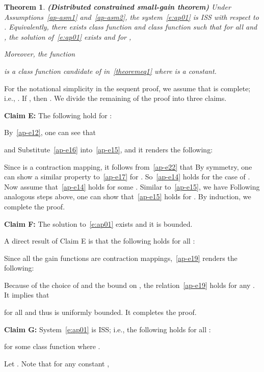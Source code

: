 \documentclass[journal]{IEEEtran}
\newtheorem{theorem}{\bf Theorem}[section]
\begin{document}
\begin{theorem}\textbf{(Distributed constrained small-gain theorem)}
Under Assumptions~\ref{ap-asm1} and~\ref{ap-asm2}, the system~\eqref{e:ap01} is ISS with respect to . Equivalently, there exists class  function  and class  function  such that for all  and , the solution of~\eqref{e:ap01} exists and for ,

Moreover, the function
 
is a class  function candidate of  in~\eqref{theoremeq1} where  is a constant.
\label{ap-the3}
\end{theorem}
\begin{IEEEproof} For the notational simplicity in the sequent proof, we assume that  is complete; i.e., . If , then . We divide the remaining of the proof into three claims.

\textbf{Claim E:} The following hold for : 
\begin{IEEEproof} By~\eqref{ap-e12}, one can see that

and 
Substitute~\eqref{ap-e16} into~\eqref{ap-e15}, and it renders the following:

Since  is a contraction mapping, it follows from~\eqref{ap-e22} that 
By symmetry, one can show a similar property to~\eqref{ap-e17} for . So~\eqref{ap-e14} holds for the case of .
Now assume that~\eqref{ap-e14} holds for some . Similar to~\eqref{ap-e15}, we have 
Following analogous steps above, one can show that~\eqref{ap-e15} holds for . By induction, we complete the proof.
\end{IEEEproof}

\textbf{Claim F:} The solution to~\eqref{e:ap01} exists and it is bounded.
\begin{IEEEproof} A direct result of Claim E is that the following holds for all :

Since all the gain functions  are contraction mappings,~\eqref{ap-e19} renders the following:

Because of the choice of  and the bound on , the relation~\eqref{ap-e19} holds for any . It implies that

for all  and thus is uniformly bounded. It completes the proof.
\end{IEEEproof}

\textbf{Claim G:}
System~\eqref{e:ap01} is ISS; i.e., the following holds for all :

for some class  function  where .
\begin{IEEEproof}
Let . Note that for any constant ,


\end{IEEEproof}
\end{IEEEproof}
\end{document}
